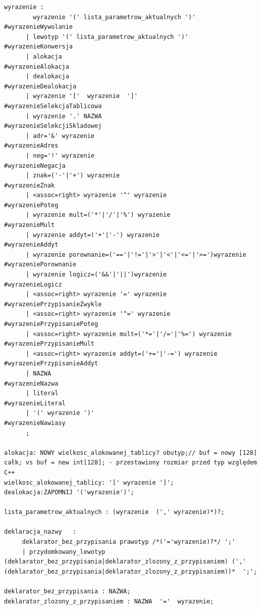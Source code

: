 \begin{lstlisting}[basicstyle=\scriptsize\ttfamily,breaklines=true]
wyrazenie :
        wyrazenie '(' lista_parametrow_aktualnych ')'               #wyrazenieWywolanie
      | lewotyp '(' lista_parametrow_aktualnych ')'                 #wyrazenieKonwersja
      | alokacja                                                    #wyrazenieAlokacja
      | dealokacja                                                  #wyrazenieDealokacja
      | wyrazenie '['  wyrazenie  ']'                               #wyrazenieSelekcjaTablicowa
      | wyrazenie '.' NAZWA                                         #wyrazenieSelekcjiSkladowej
      | adr='&' wyrazenie                                           #wyrazenieAdres
      | neg='!' wyrazenie                                           #wyrazenieNegacja
      | znak=('-'|'+') wyrazenie                                    #wyrazenieZnak
      | <assoc=right> wyrazenie '^' wyrazenie                       #wyrazeniePoteg
      | wyrazenie mult=('*'|'/'|'%') wyrazenie                      #wyrazenieMult
      | wyrazenie addyt=('+'|'-') wyrazenie                         #wyrazenieAddyt
      | wyrazenie porownanie=('=='|'!='|'>'|'<'|'<='|'>=')wyrazenie #wyrazeniePorownanie
      | wyrazenie logicz=('&&'|'||')wyrazenie                       #wyrazenieLogicz
      | <assoc=right> wyrazenie '=' wyrazenie                       #wyrazeniePrzypisanieZwykle
      | <assoc=right> wyrazenie '^=' wyrazenie                      #wyrazeniePrzypisaniePoteg
      | <assoc=right> wyrazenie mult=('*='|'/='|'%=') wyrazenie     #wyrazeniePrzypisanieMult
      | <assoc=right> wyrazenie addyt=('+='|'-=') wyrazenie         #wyrazeniePrzypisanieAddyt
      | NAZWA                                                       #wyrazenieNazwa
      | literal                                                     #wyrazenieLiteral
      | '(' wyrazenie ')'                                           #wyrazenieNawiasy
      ;

alokacja: NOWY wielkosc_alokowanej_tablicy? obutyp;// buf = nowy [128] całk; vs buf = new int[128]; - przestawiony rozmiar przed typ względem C++
wielkosc_alokowanej_tablicy: '[' wyrazenie ']';
dealokacja:ZAPOMNIJ '('wyrazenie')';

lista_parametrow_aktualnych : (wyrazenie  (',' wyrazenie)*)?;

deklaracja_nazwy   :
     deklarator_bez_przypisania prawotyp /*('='wyrazenie)?*/ ';'
     | przydomkowany_lewotyp (deklarator_bez_przypisania|deklarator_zlozony_z_przypisaniem) (',' (deklarator_bez_przypisania|deklarator_zlozony_z_przypisaniem))*  ';';

deklarator_bez_przypisania : NAZWA;
deklarator_zlozony_z_przypisaniem : NAZWA  '='  wyrazenie;


\end{lstlisting}
